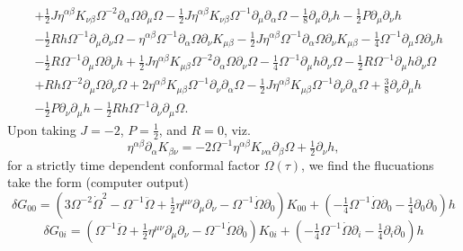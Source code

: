 \documentclass[10pt,letterpaper]{article}
\begin{document}
\begin{align}
& + \tfrac{1}{2} J \eta^{\alpha \beta} K_{\nu \beta} \Omega^{-2} \partial_{\alpha}\Omega \partial_{\mu}\Omega
 -  \tfrac{1}{2} J \eta^{\alpha \beta} K_{\nu \beta} \Omega^{-1} \partial_{\mu}\partial_{\alpha}\Omega
 -  \tfrac{1}{8} \partial_{\mu}\partial_{\nu}h
 -  \tfrac{1}{2} P \partial_{\mu}\partial_{\nu}h\nonumber\\
& -  \tfrac{1}{2} R h \Omega^{-1} \partial_{\mu}\partial_{\nu}\Omega
 -  \eta^{\alpha \beta} \Omega^{-1} \partial_{\alpha}\Omega \partial_{\nu}K_{\mu \beta}
 -  \tfrac{1}{2} J \eta^{\alpha \beta} \Omega^{-1} \partial_{\alpha}\Omega \partial_{\nu}K_{\mu \beta}
 -  \tfrac{1}{4} \Omega^{-1} \partial_{\mu}\Omega \partial_{\nu}h\nonumber\\
& -  \tfrac{1}{2} R \Omega^{-1} \partial_{\mu}\Omega \partial_{\nu}h
 + \tfrac{1}{2} J \eta^{\alpha \beta} K_{\mu \beta} \Omega^{-2} \partial_{\alpha}\Omega \partial_{\nu}\Omega
 -  \tfrac{1}{4} \Omega^{-1} \partial_{\mu}h \partial_{\nu}\Omega
 -  \tfrac{1}{2} R \Omega^{-1} \partial_{\mu}h \partial_{\nu}\Omega\nonumber\\
& + R h \Omega^{-2} \partial_{\mu}\Omega \partial_{\nu}\Omega
 + 2 \eta^{\alpha \beta} K_{\mu \beta} \Omega^{-1} \partial_{\nu}\partial_{\alpha}\Omega
 -  \tfrac{1}{2} J \eta^{\alpha \beta} K_{\mu \beta} \Omega^{-1} \partial_{\nu}\partial_{\alpha}\Omega
 + \tfrac{3}{8} \partial_{\nu}\partial_{\mu}h\nonumber\\
& -  \tfrac{1}{2} P \partial_{\nu}\partial_{\mu}h
 -  \tfrac{1}{2} R h \Omega^{-1} \partial_{\nu}\partial_{\mu}\Omega.
\end{align}
Upon taking $J=-2$, $P=\tfrac12$, and $R=0$, viz.
\begin{equation}
	\eta^{\alpha\beta}\partial_{\alpha}K_{\beta\nu} = -2\Omega^{-1}  \eta^{\alpha\beta}K_{\nu\alpha}\partial_\beta \Omega + \tfrac12 \partial_\nu h,
\end{equation}
for a strictly time dependent conformal factor $\Omega(\tau)$, we find the flucuations take the form (computer output)
\begin{equation}
\delta G_{00}=
(3 \Omega^{-2} \dot{\Omega}^2 -  \Omega^{-1} \ddot{\Omega} + \tfrac{1}{2} \eta^{\mu \nu} \partial_{\mu} \partial_{\nu} -  \Omega^{-1} \dot{\Omega} \partial_{0}) K_{00} + (- \tfrac{1}{4} \Omega^{-1} \dot{\Omega} \partial_{0} -  \tfrac{1}{4} \partial_{0} \partial_{0}) h
\end{equation}
\begin{equation}
\delta G_{0i}=
(\Omega^{-1} \ddot{\Omega} + \tfrac{1}{2} \eta^{\mu \nu} \partial_{\mu} \partial_{\nu} -  \Omega^{-1} \dot{\Omega} \partial_{0}) K_{0i} + (- \tfrac{1}{4} \Omega^{-1} \dot{\Omega} \partial_{i} -  \tfrac{1}{4} \partial_{i} \partial_{0}) h
\end{equation}
\end{document}
